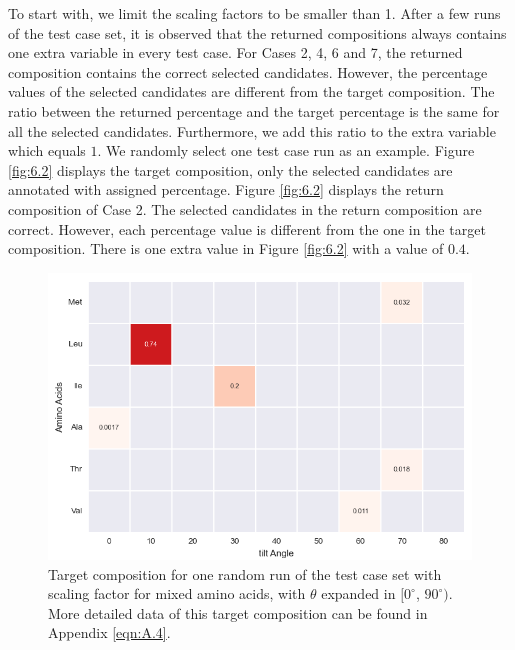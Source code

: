 To start with, we limit the scaling factors to be smaller than 1. After a few runs of the test case set, it is observed that the returned compositions always contains one extra variable in every test case. For Cases 2, 4, 6 and 7, the returned composition contains the correct selected candidates. However, the percentage values of the selected candidates are different from the target composition. The ratio between the returned percentage and the target percentage is the same for all the selected candidates. Furthermore, we add this ratio to the extra variable which equals $1$. We randomly select one test case run as an example. Figure \ref{fig:6.2} displays the target composition, only the selected candidates are annotated with assigned percentage. Figure \ref{fig:6.2} displays the return composition of Case 2. The selected candidates in the return composition are correct. However, each percentage value is different from the one in the target composition. There is one extra value in Figure \ref{fig:6.2} with a value of $0.4$. \\

\begin{figure}[!ht] 
\centering
\includegraphics[scale=0.7]{Figures/chapter6_figure_one.png}
\caption{Target composition for one random run of the test case set with scaling factor for mixed amino acids, with $\theta$ expanded in $[0^{\circ}$, $90^{\circ})$. More detailed data of this target composition can be found in Appendix \ref{eqn:A.4}.} \label{fig:6.1}
\end{figure}

